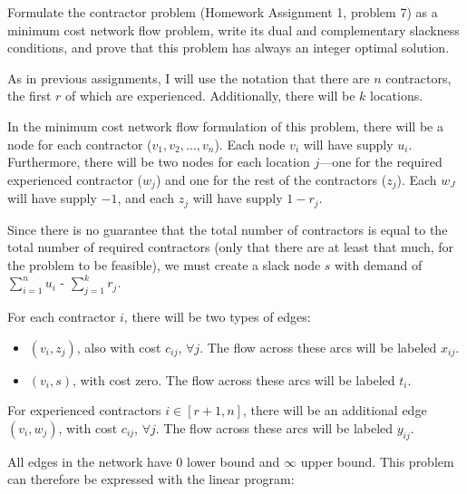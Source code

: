 \documentclass[fleqn]{homework}
\begin{document}
  \begin{problem}{2}
    \begin{question}
      Formulate the contractor problem (Homework Assignment 1, problem 7) as a
      minimum cost network ﬂow problem, write its dual and complementary
      slackness conditions, and prove that this problem has always an integer
      optimal solution.
    \end{question}

    As in previous assignments, I will use the notation that there are $n$
    contractors, the first $r$ of which are experienced.  Additionally, there
    will be $k$ locations.

    In the minimum cost network flow formulation of this problem, there will be
    a node for each contractor ($v_1, v_2, \dots, v_n$).  Each node $v_i$ will
    have supply $u_i$.  Furthermore, there will be two nodes for each location
    $j$---one for the required experienced contractor ($w_j$) and one for the
    rest of the contractors ($z_j$).  Each $w_J$ will have supply $-1$, and each
    $z_j$ will have supply $1-r_j$.

    Since there is no guarantee that the total number of contractors is equal to
    the total number of required contractors (only that there are at least that
    much, for the problem to be feasible), we must create a slack node $s$ with
    demand of $\sum_{i=1}^n u_i$ - $\sum_{j=1}^k r_j$.

    For each contractor $i$, there will be two types of edges:
    
    \begin{itemize}
    \item $(v_i, z_j)$, also with cost $c_{ij}$, $\forall j$.  The flow across
      these arcs will be labeled $x_{ij}$.
    \item $(v_i, s)$, with cost zero.  The flow across these arcs will be
      labeled $t_i$.
    \end{itemize}

    For experienced contractors $i \in [r+1,n]$, there will be an additional
    edge $(v_i, w_j)$, with cost $c_{ij}$, $\forall j$.  The flow across these
    arcs will be labeled $y_{ij}$.

    All edges in the network have 0 lower bound and $\infty$ upper bound.  This
    problem can therefore be expressed with the linear program:


\end{problem}
\end{document}
